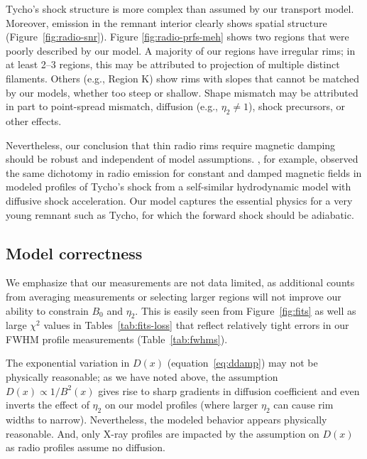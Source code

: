 \documentclass[manuscript]{aastex}  %
\begin{document}
Tycho's shock structure is more complex than assumed by our transport model.
Moreover, emission in the remnant interior clearly shows spatial structure
(Figure~\ref{fig:radio-snr}).  Figure \ref{fig:radio-prfs-meh} shows two
regions that were poorly described by our model.  A majority of our regions
have irregular rims; in at least 2--3 regions, this may be attributed to
projection of multiple distinct filaments.  Others (e.g., Region K) show rims
with slopes that cannot be matched by our models, whether too steep or
shallow.  Shape mismatch may be attributed in part to point-spread mismatch,
diffusion (e.g., $\eta_2 \neq 1$), shock precursors, or other effects.

Nevertheless, our conclusion that thin radio rims require magnetic damping
should be robust and independent of model assumptions.
\citet{cassam-chenai2007}, for example, observed the same dichotomy in radio
emission for constant and damped magnetic fields in modeled profiles of Tycho's
shock from a self-similar hydrodynamic model with diffusive shock acceleration.
Our model captures the essential physics for a very young remnant such as
Tycho, for which the forward shock should be adiabatic.


\subsection{Model correctness}

We emphasize that our measurements are not data limited, as additional counts
from averaging measurements or selecting larger regions will not improve our
ability to constrain $B_0$ and $\eta_2$.  This is easily seen from
Figure~\ref{fig:fits} as well as large $\chi^2$ values in
Tables~\ref{tab:fits-loss} that reflect relatively tight errors in our FWHM
profile measurements (Table~\ref{tab:fwhms}).

The exponential variation in $D(x)$ (equation~\eqref{eq:ddamp}) may not be
physically reasonable; as we have noted above, the assumption $D(x)
\propto 1 / B^2(x)$ gives rise to sharp gradients in diffusion coefficient and
even inverts the effect of $\eta_2$ on our model profiles (where larger
$\eta_2$ can cause rim widths to narrow).  Nevertheless, the modeled behavior
appears physically reasonable.  And, only X-ray profiles are impacted by the
assumption on $D(x)$ as radio profiles assume no diffusion.
\end{document}
